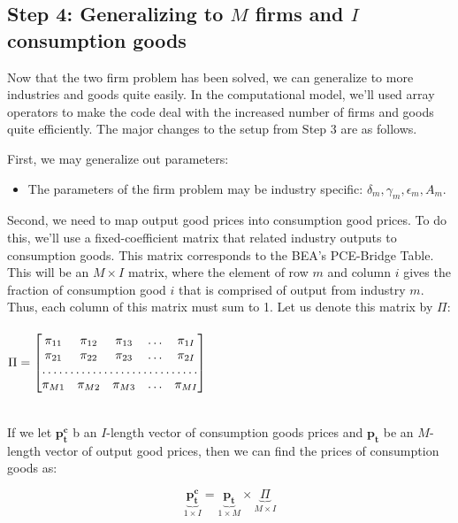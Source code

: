 \documentclass[letterpaper,12pt]{article}
\theoremstyle{definition}
\begin{document}
\begin{spacing}{1.5}
\section*{Step 4: Generalizing to $M$ firms and $I$ consumption goods}

Now that the two firm problem has been solved, we can generalize to more industries and goods quite easily.  In the computational model, we'll used array operators to make the code deal with the increased number of firms and goods quite efficiently.  The major changes to the setup from Step 3 are as follows.

First, we may generalize out parameters:
\begin{itemize}
\item The parameters of the firm problem may be industry specific: $\delta_{m}, \gamma_{m}, \epsilon_{m}, A_{m}$.
\end{itemize}

Second, we need to map output good prices into consumption good prices.  To do this, we'll use a fixed-coefficient matrix that related industry outputs to consumption goods.  This matrix corresponds to the BEA's PCE-Bridge Table.  This will be an $M\times I$ matrix, where the element of row $m$ and column $i$ gives the fraction of consumption good $i$ that is comprised of output from industry $m$.  Thus, each column of this matrix must sum to 1.  Let us denote this matrix by $\Pi$: \\
\ \\
$\Pi=
\begin{bmatrix}
    \pi_{11}       & \pi_{12} & \pi_{13} & \dots & \pi_{1I} \\
    \pi_{21}       & \pi_{22} & \pi_{23} & \dots & \pi_{2I} \\
    \hdotsfor{5} \\
    \pi_{M1}       & \pi_{M2} & \pi_{M3} & \dots & \pi_{MI}
\end{bmatrix}$

\ \\
If we let $\boldsymbol{p^{c}_{t}}$ b an $I$-length vector of consumption goods prices and $\boldsymbol{p_{t}}$ be an $M$-length vector of output good prices, then we can find the prices of consumption goods as:

\begin{equation}
\label{eqn:capital_prices}
\underbrace{\boldsymbol{p^{c}_{t}}}_{1\times I} =\underbrace{\boldsymbol{p_{t}}}_{1\times M} \times  \underbrace{\Pi}_{M\times I}
\end{equation}


\end{spacing}
\end{document}
